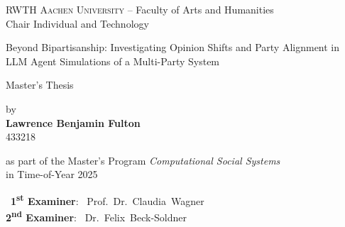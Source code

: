 

\begin{titlepage}
  \begin{center}

    {\large
      \textsc{RWTH Aachen University} -- Faculty of Arts and Humanities\\
      Chair Individual and Technology
    }

    \vspace{3.2 cm}

    \hrulefill\par
    { 
      \huge
      Beyond Bipartisanship: Investigating Opinion Shifts and Party Alignment in LLM Agent Simulations of a Multi-Party System\\
    }
    \par\medskip\hrulefill\par

    \vspace{2.1 cm}

    {\huge
      Master's Thesis
    }

    \vspace{1.5 cm}

    {\Large by\\[2.3ex]
      {\bf Lawrence Benjamin Fulton}\\[2.3ex]
      433218
    }
    
    \vspace{1.7 cm}

    {\large as part of the Master's Program \textit{Computational Social Systems}}\\[2.3ex]    
    {\large in Time-of-Year 2025}

    \vfill

    \parbox{10cm}{%
      ~\textbf{1\textsuperscript{st} Examiner}: ~Prof.~Dr.~Claudia~Wagner\\
      \textbf{2\textsuperscript{nd} Examiner}: ~Dr.~Felix~Beck-Soldner\\
    }
    
  \end{center}
\end{titlepage}
